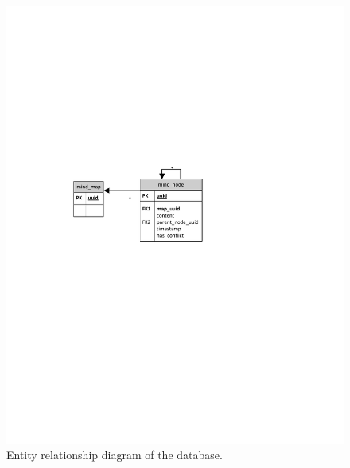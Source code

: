 \begin{figure}[h]
	\centering
	\includegraphics{graphics-erd}
	\caption{Entity relationship diagram of the database.}
	\label{fig:erd}
\end{figure}
